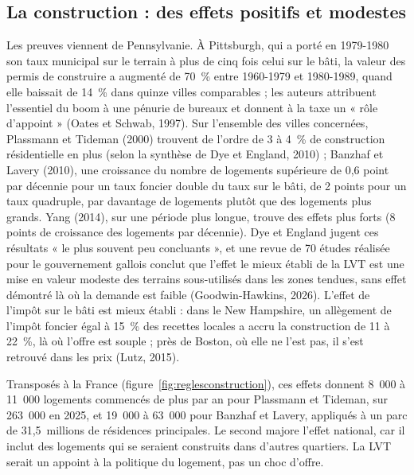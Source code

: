 \documentclass[11pt,a4paper]{article}
\begin{document}

\subsection{La construction : des effets positifs et modestes}

Les preuves viennent de Pennsylvanie. À Pittsburgh, qui a porté en 1979-1980 son taux municipal sur
le terrain à plus de cinq fois celui sur le bâti, la valeur des permis de construire a augmenté de
70~\% entre 1960-1979 et 1980-1989, quand elle baissait de 14~\% dans quinze villes comparables ; les
auteurs attribuent l'essentiel du boom à une pénurie de bureaux et donnent à la taxe un « rôle
d'appoint » (Oates et Schwab, 1997). Sur l'ensemble des villes concernées, Plassmann et Tideman (2000) trouvent de
l'ordre de 3 à 4~\% de construction résidentielle en plus (selon la synthèse de Dye et England,
2010) ; Banzhaf et Lavery (2010), une croissance du nombre de logements supérieure de 0,6 point par
décennie pour un taux foncier double du taux sur le bâti, de 2 points pour un taux quadruple, par
davantage de logements plutôt que des logements plus grands. Yang (2014), sur une période
plus longue, trouve des effets plus forts (8 points de croissance des logements par décennie). Dye
et England jugent ces résultats « le plus souvent peu concluants », et une revue de 70 études
réalisée pour le gouvernement gallois conclut que l'effet le mieux établi de la LVT est une mise en
valeur modeste des terrains sous-utilisés dans les zones tendues, sans effet démontré là où la
demande est faible (Goodwin-Hawkins, 2026). L'effet de l'impôt sur le bâti est mieux établi : dans le New Hampshire, un allègement de l'impôt foncier égal à
15~\% des recettes locales a accru la construction de 11 à 22~\%, là où l'offre est souple ; près
de Boston, où elle ne l'est pas, il s'est retrouvé dans les prix (Lutz, 2015).

Transposés à la France (figure~\ref{fig:reglesconstruction}), ces effets donnent 8~000 à
11~000 logements commencés de plus par an pour Plassmann et Tideman, sur 263~000 en 2025, et
19~000 à 63~000 pour Banzhaf et Lavery, appliqués à un parc de 31,5~millions de résidences
principales. Le second majore l'effet national, car il inclut des logements qui se seraient construits
dans d'autres quartiers. La LVT serait un appoint à la politique du logement, pas un choc d'offre.
\end{document}
